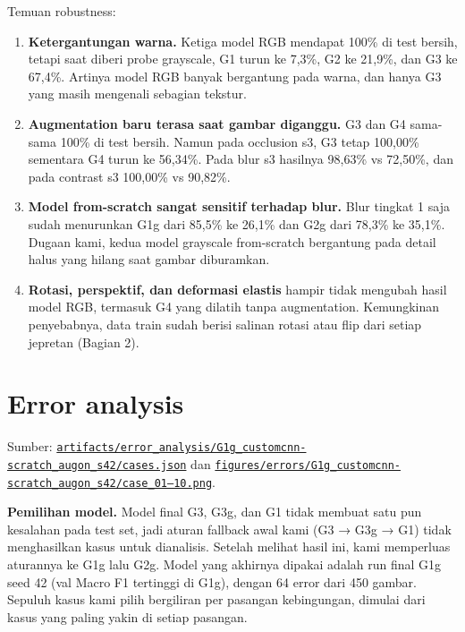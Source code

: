 \documentclass[10pt,a4paper]{article}
\providecommand{\tightlist}{\setlength{\itemsep}{2pt}\setlength{\parskip}{0pt}}
\begin{document}
Temuan robustness:

\begin{enumerate}
\def\labelenumi{\arabic{enumi}.}
\tightlist
\item
  \textbf{Ketergantungan warna.} Ketiga model RGB mendapat 100\% di test bersih, tetapi saat diberi probe grayscale, G1 turun ke 7,3\%, G2 ke 21,9\%, dan G3 ke 67,4\%. Artinya model RGB banyak bergantung pada warna, dan hanya G3 yang masih mengenali sebagian tekstur.
\item
  \textbf{Augmentation baru terasa saat gambar diganggu.} G3 dan G4 sama-sama 100\% di test bersih. Namun pada occlusion s3, G3 tetap 100,00\% sementara G4 turun ke 56,34\%. Pada blur s3 hasilnya 98,63\% vs 72,50\%, dan pada contrast s3 100,00\% vs 90,82\%.
\item
  \textbf{Model from-scratch sangat sensitif terhadap blur.} Blur tingkat 1 saja sudah menurunkan G1g dari 85,5\% ke 26,1\% dan G2g dari 78,3\% ke 35,1\%. Dugaan kami, kedua model grayscale from-scratch bergantung pada detail halus yang hilang saat gambar diburamkan.
\item
  \textbf{Rotasi, perspektif, dan deformasi elastis} hampir tidak mengubah hasil model RGB, termasuk G4 yang dilatih tanpa augmentation. Kemungkinan penyebabnya, data train sudah berisi salinan rotasi atau flip dari setiap jepretan (Bagian 2).
\end{enumerate}

\section{Error analysis}\label{error-analysis}

Sumber: \href{https://github.com/Universitas-Cakrawala/semarang-batik-fine-grained-transfer-learning/blob/main/artifacts/error_analysis/G1g_customcnn-scratch_augon_s42/cases.json}{\texttt{artifacts/\allowbreak{}error\_\allowbreak{}analysis/\allowbreak{}G1g\_\allowbreak{}customcnn-\allowbreak{}scratch\_\allowbreak{}augon\_\allowbreak{}s42/\allowbreak{}cases.json}} dan
\href{https://github.com/Universitas-Cakrawala/semarang-batik-fine-grained-transfer-learning/tree/main/figures/errors/G1g_customcnn-scratch_augon_s42}{\texttt{figures/\allowbreak{}errors/\allowbreak{}G1g\_\allowbreak{}customcnn-\allowbreak{}scratch\_\allowbreak{}augon\_\allowbreak{}s42/\allowbreak{}case\_\allowbreak{}01–10.png}}.

\textbf{Pemilihan model.} Model final G3, G3g, dan G1 tidak membuat satu pun kesalahan pada test set, jadi aturan fallback awal kami (G3 → G3g → G1) tidak menghasilkan kasus untuk dianalisis. Setelah melihat hasil ini, kami memperluas aturannya ke G1g lalu G2g. Model yang akhirnya dipakai adalah run final G1g seed 42 (val Macro F1 tertinggi di G1g), dengan 64 error dari 450 gambar. Sepuluh kasus kami pilih bergiliran per pasangan kebingungan, dimulai dari kasus yang paling yakin di setiap pasangan.
\end{document}
